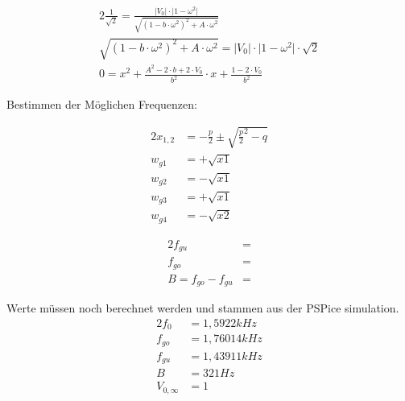 \begin{alignat}{2}
\frac{1}{\sqrt{2}} = \frac{\lvert V_{0} \rvert \cdot \lvert 1-  \omega^2 \rvert}{\sqrt{(1- b \cdot \omega^2)^2 + A \cdot \omega^2}}\\
\sqrt{(1- b \cdot \omega^2)^2 + A \cdot \omega^2} = \lvert V_{0} \rvert \cdot \lvert 1-\omega^2 \rvert \cdot \sqrt{2}\\
0 = x^2 + \frac{A^2-2 \cdot b + 2\cdot V_{0}}{b^2} \cdot x + \frac{1-2\cdot V_{0}}{b^2}
\end{alignat}

\noindent Bestimmen der Möglichen Frequenzen:

\begin{alignat}{2}
x_{1,2} &= -\frac{p}{2} \pm \sqrt{\frac{p}{2}^2 - q}\\
w_{g1} &= +\sqrt{x1}\\
w_{g2} &= -\sqrt{x1}\\
w_{g3} &= +\sqrt{x1}\\
w_{g4} &= -\sqrt{x2}
\end{alignat}

\begin{alignat}{2}
f_{gu} &= \\
f_{go} &= \\
B = f_{go} - f_{gu} &= 
\end{alignat}







Werte müssen noch berechnet werden und stammen aus der PSPice simulation.\\

\begin{alignat}{2}
f_{0} &= 1,5922 kHz\\
f_{go} &= 1,76014 kHz\\
f_{gu} &= 1,43911 kHz\\
B &= 321 Hz\\
V_{0,\infty} &= 1
\end{alignat}